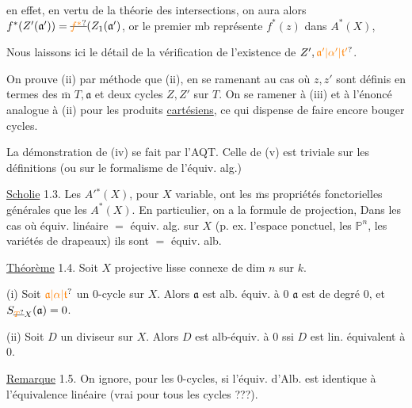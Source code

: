 en effet, en vertu de la théorie des intersections, on aura alors $f^*(Z'(\mathfrak a'))=\deleted{\unsure{f^*}}(Z_1(\mathfrak a')$, or le premier mb  représente $f^*(z)$ dans $A^*(X)$, 


Nous laissons ici le détail de la vérification de l'existence de $Z',\unsure{\mathfrak a'|\alpha'|\mathfrak{t}'}$.

On prouve (ii) par  méthode que (ii),  en se ramenant au cas où $z,z'$ sont définis en termes des $\overline{\mathrm m}$ $T,\mathfrak a$ et deux cycles $Z,Z'$ sur $T$. On  se ramener  à (iii) et à l'énoncé analogue à (ii) pour les produits \uline{cartésiens}, ce qui dispense de faire encore bouger  cycles.

La démonstration de (iv) se fait par l'AQT. Celle de (v) est triviale sur les définitions (ou sur le formalisme de l'équiv. alg.)

 \uline{Scholie} 1.3. Les $A'{}^*(X)$, pour $X$ variable, ont les $\overline{\mathrm m}$s propriétés fonctorielles générales que les $A^*(X)$. En particulier, on a la formule de projection, Dans les cas où équiv. linéaire $=$ équiv. alg. sur $X$ (p. ex. l'espace ponctuel, les $\mathbb P^n$, les variétés de drapeaux) ils sont $=$ équiv. alb.


\uline{Théorème} 1.4. Soit $X$ projective lisse connexe de dim $n$ sur $k$. 

(i) Soit $\unsure{\mathfrak a|\alpha|\mathfrak{t}}$ un $0$-cycle sur $X$. Alors $\mathfrak a$ est alb. équiv. à $0$  $\mathfrak a$ est de degré $0$, et $S_{\deleted{\unsure{T}}X}(\mathfrak a)=0$.

(ii) Soit $D$ un diviseur sur $X$. Alors $D$ est alb-équiv. à $0$ ssi $D$ est lin. équivalent à $0$.

\uline{Remarque} 1.5. On ignore,  pour les $0$-cycles, si l'équiv. d'Alb. est identique à l'équivalence linéaire (vrai pour tous les cycles ???).

